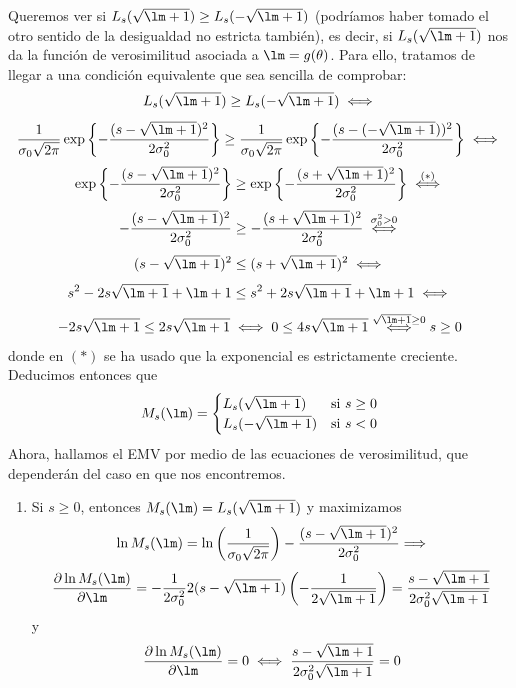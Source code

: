 \documentclass[12pt]{article}
\begin{document}
\begin{ejercicio}[1.85 puntos]
\begin{enumerate}[label=\alph*)]
            Queremos ver si $L_s(\sqrt{\lm+1}) \geq L_s(-\sqrt{\lm+1})$ (podríamos haber tomado el otro sentido
            de la desigualdad no estricta también), es decir, si $L_s(\sqrt{\lm+1})$ nos da la función de verosimilitud asociada a $\lm = g(\theta)$. Para ello, tratamos de llegar a una condición
            equivalente que sea sencilla de comprobar:
            $$L_s(\sqrt{\lm+1}) \geq L_s(-\sqrt{\lm+1}) \iff $$
            $$
            \dfrac{1}{\sigma_0 \sqrt{2 \pi}} \exp \left\{ - \dfrac{(s-\sqrt{\lm+1})^2}{2 \sigma_0^2}\right\} \geq
            \dfrac{1}{\sigma_0 \sqrt{2 \pi}} \exp \left\{ - \dfrac{(s-(-\sqrt{\lm+1}))^2}{2 \sigma_0^2}\right\} \iff$$
            $$\exp \left\{ - \dfrac{(s-\sqrt{\lm+1})^2}{2 \sigma_0^2}\right\} \geq
            \exp \left\{ - \dfrac{(s+\sqrt{\lm+1})^2}{2 \sigma_0^2}\right\} \stackrel{(*)}{\iff}$$
            $$- \dfrac{(s-\sqrt{\lm+1})^2}{2 \sigma_0^2} \geq - \dfrac{(s+\sqrt{\lm+1})^2}{2 \sigma_0^2} 
            \stackrel{\sigma_0^2 > 0}{\iff}$$
            $$(s-\sqrt{\lm+1})^2 \leq (s+\sqrt{\lm+1})^2 \iff$$
            $$s^2 - 2 s \sqrt{\lm + 1} + \lm + 1 \leq s^2 + 2 s \sqrt{\lm + 1} + \lm + 1 \iff$$
            $$- 2 s \sqrt{\lm + 1} \leq 2 s \sqrt{\lm + 1} \iff 
            0 \leq 4 s \sqrt{\lm + 1} \stackrel{\sqrt{\lm+1} \geq 0}{\iff} s \geq 0$$
            donde en $(*)$ se ha usado que la exponencial es estrictamente creciente. Deducimos entonces que 
            $$M_s(\lm) = \begin{cases}
                L_s(\sqrt{\lm+1}) &\text{si } s \geq 0 \\
                L_s(-\sqrt{\lm+1}) &\text{si } s < 0
            \end{cases}$$
            Ahora, hallamos el EMV por medio de las ecuaciones de verosimilitud, que dependerán del caso en que nos encontremos.
            \begin{enumerate}
                \item Si $s \geqslant 0$, entonces $M_s(\lm) = L_s(\sqrt{\lm+1})$ y maximizamos
                $$\ln M_s(\lm) = \ln \left( \dfrac{1}{\sigma_0 \sqrt{2 \pi}} \right)
                - \dfrac{(s-\sqrt{\lm+1})^2}{2 \sigma_0^2} \Longrightarrow$$ 
                $$ \dfrac{\partial \ln M_s(\lm)}{\partial \lm} = - \dfrac{1}{2 \sigma_0^2}
                2 (s - \sqrt{\lm+1}) \left( - \dfrac{1}{2 \sqrt{\lm+1}} \right) = \dfrac{s-\sqrt{\lm+1}}{2 \sigma_0^2 \sqrt{\lm+1}}$$
                y 
                $$\dfrac{\partial \ln M_s(\lm)}{\partial \lm} = 0 \iff 
                \dfrac{s-\sqrt{\lm+1}}{2 \sigma_0^2 \sqrt{\lm+1}} = 0 
$$
\end{enumerate}
\end{enumerate}
\end{ejercicio}
\end{document}
